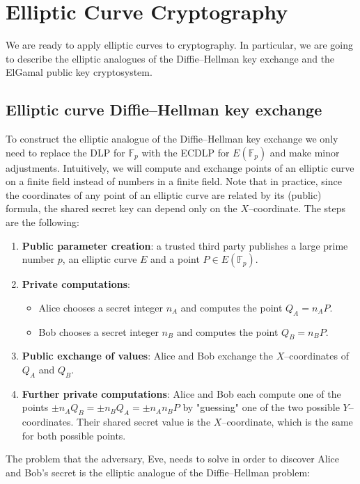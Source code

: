 \documentclass[9pt]{article}
\theoremstyle{definition}
\begin{document}
\section{Elliptic Curve Cryptography}
We are ready to apply elliptic curves to cryptography. In particular, we are going to describe the elliptic analogues of the Diffie--Hellman key exchange and the ElGamal public key cryptosystem.

\subsection{Elliptic curve Diffie--Hellman key exchange}
To construct the elliptic analogue of the Diffie--Hellman key exchange we only need to replace the DLP for $\mathbb{F}_p$ with the ECDLP for $E(\mathbb{F}_p)$ and make minor adjustments. Intuitively, we will compute and exchange points of an elliptic curve on a finite field instead of numbers in a finite field. Note that in practice, since the coordinates of any point of an elliptic curve are related by its (public) formula, the shared secret key can depend only on the $X$--coordinate. The steps are the following:
\begin{enumerate}[label=\textbf{\arabic*.}]
    \item \textbf{Public parameter creation}: a trusted third party publishes a large prime number $p$, an elliptic curve $E$ and a point $P \in E(\mathbb{F}_p)$. 
    \item \textbf{Private computations}:
        \begin{itemize}
            \item Alice chooses a secret integer $n_A$ and computes the point $Q_A = n_A P$.
            \item Bob chooses a secret integer $n_B$ and computes the point $Q_B = n_B P$.
        \end{itemize}
    \item \textbf{Public exchange of values}: Alice and Bob exchange the $X$--coordinates of $Q_A$ and $Q_B$.
    \item \textbf{Further private computations}: Alice and Bob each compute one of the points $\pm n_A Q_B = \pm n_B Q_A = \pm n_A n_BP$ by "guessing" one of the two possible $Y$--coordinates. Their shared secret value is the $X$--coordinate, which is the same for both possible points.
\end{enumerate}

The problem that the adversary, Eve, needs to solve in order to discover Alice and Bob's secret is the elliptic analogue of the Diffie--Hellman problem:
\end{document}
